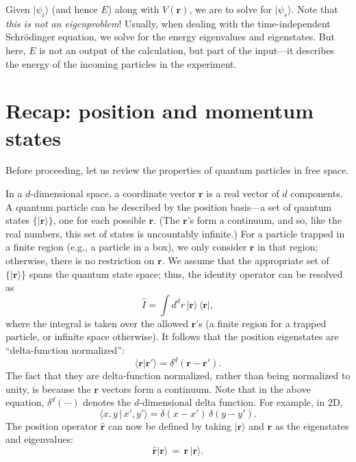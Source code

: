\documentclass[pra,11pt]{revtex4}
\begin{document}
Given $|\psi_i\rangle$ (and hence $E$) along with $V(\mathbf{r})$, we
are to solve for $|\psi_s\rangle$.  Note that \textit{this is not an
  eigenproblem}!  Usually, when dealing with the time-independent
Schr\"odinger equation, we solve for the energy eigenvalues and
eigenstates.  But here, $E$ is not an output of the calculation, but
part of the input---it describes the energy of the incoming particles
in the experiment.

\section{Recap: position and momentum states}

Before proceeding, let us review the properties of quantum particles
in free space.

In a $d$-dimensional space, a coordinate vector $\mathbf{r}$ is a real
vector of $d$ components.  A quantum particle can be described by the
position basis---a set of quantum states $\{|\mathbf{r}\rangle\}$, one
for each possible $\mathbf{r}$.  (The $\mathbf{r}$'s form a continuum,
and so, like the real numbers, this set of states is uncountably
infinite.)  For a particle trapped in a finite region (e.g., a
particle in a box), we only consider $\mathbf{r}$ in that region;
otherwise, there is no restriction on $\mathbf{r}$.  We assume that
the appropriate set of $\{|\mathbf{r}\rangle\}$ spans the quantum
state space; thus, the identity operator can be resolved as
$$\hat{I} = \int d^dr \, |\mathbf{r}\rangle \,\langle\mathbf{r}|,$$
where the integral is taken over the allowed $\mathbf{r}$'s (a finite
region for a trapped particle, or infinite space otherwise).  It
follows that the position eigenstates are ``delta-function normalized'':
$$\langle \mathbf{r} | \mathbf{r}' \rangle = \delta^d(\mathbf{r}-\mathbf{r}').$$
The fact that they are delta-function normalized, rather than being
normalized to unity, is because the $\mathbf{r}$ vectors form a
continuum.  Note that in the above equation, $\delta^d(\cdots)$
denotes the $d$-dimensional delta function.  For example, in 2D,
$$\langle x,y \,|\, x',y' \rangle = \delta(x-x') \, \delta(y-y').$$
The position operator $\hat{\mathbf{r}}$ can now be defined by taking
$|\mathbf{r}\rangle$ and $\mathbf{r}$ as the eigenstates and
eigenvalues:
$$\hat{\mathbf{r}} |\mathbf{r}\rangle \,=\, \mathbf{r}\, |\mathbf{r}\rangle.$$
\end{document}

